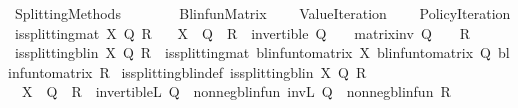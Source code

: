 %
\begin{isabellebody}%
%
%
\isadelimtheory
\isanewline
\isanewline
%
\endisadelimtheory
%
\isatagtheory
{}\isamarkupfalse%
\ Splitting{\isacharunderscore}{\kern0pt}Methods\isanewline
\ \ \ \isanewline
\ \ \ \ Blinfun{\isacharunderscore}{\kern0pt}Matrix\isanewline
\ \ \ \ Value{\isacharunderscore}{\kern0pt}Iteration\isanewline
\ \ \ \ Policy{\isacharunderscore}{\kern0pt}Iteration\isanewline
{}%
\endisatagtheory
{\isafoldtheory}%
%
\isadelimtheory
%
\endisadelimtheory
%
\isadelimdocument
%
\endisadelimdocument
%
\isatagdocument
%
\isamarkuptrue%
%
\isamarkuptrue%
%
\endisatagdocument
{\isafolddocument}%
%
\isadelimdocument
%
\endisadelimdocument
{}\isamarkupfalse%
\ {\isachardoublequoteopen}is{\isacharunderscore}{\kern0pt}splitting{\isacharunderscore}{\kern0pt}mat\ X\ Q\ R\ {\isasymlongleftrightarrow}\isanewline
\ \ X\ {\isacharequal}{\kern0pt}\ Q\ {\isacharminus}{\kern0pt}\ R\ {\isasymand}\ invertible\ Q\ {\isasymand}\ {}\ {\isasymle}\ matrix{\isacharunderscore}{\kern0pt}inv\ Q\ {\isasymand}\ {}\ {\isasymle}\ R{\isachardoublequoteclose}\isanewline
\isanewline
{}\isamarkupfalse%
\ {\isachardoublequoteopen}is{\isacharunderscore}{\kern0pt}splitting{\isacharunderscore}{\kern0pt}blin\ X\ Q\ R\ {\isasymlongleftrightarrow}\ is{\isacharunderscore}{\kern0pt}splitting{\isacharunderscore}{\kern0pt}mat\ {\isacharparenleft}{\kern0pt}blinfun{\isacharunderscore}{\kern0pt}to{\isacharunderscore}{\kern0pt}matrix\ X{\isacharparenright}{\kern0pt}\ {\isacharparenleft}{\kern0pt}blinfun{\isacharunderscore}{\kern0pt}to{\isacharunderscore}{\kern0pt}matrix\ Q{\isacharparenright}{\kern0pt}\ {\isacharparenleft}{\kern0pt}blinfun{\isacharunderscore}{\kern0pt}to{\isacharunderscore}{\kern0pt}matrix\ R{\isacharparenright}{\kern0pt}{\isachardoublequoteclose}\isanewline
\isanewline
{}\isamarkupfalse%
\ is{\isacharunderscore}{\kern0pt}splitting{\isacharunderscore}{\kern0pt}blin{\isacharunderscore}{\kern0pt}def{\isacharprime}{\kern0pt}{\isacharcolon}{\kern0pt}\ {\isachardoublequoteopen}is{\isacharunderscore}{\kern0pt}splitting{\isacharunderscore}{\kern0pt}blin\ X\ Q\ R\ {\isasymlongleftrightarrow}\isanewline
\ \ X\ {\isacharequal}{\kern0pt}\ Q\ {\isacharminus}{\kern0pt}\ R\ {\isasymand}\ invertible\isactrlsub L\ Q\ {\isasymand}\ nonneg{\isacharunderscore}{\kern0pt}blinfun\ {\isacharparenleft}{\kern0pt}inv\isactrlsub L\ Q{\isacharparenright}{\kern0pt}\ {\isasymand}\ nonneg{\isacharunderscore}{\kern0pt}blinfun\ R{\isachardoublequoteclose}\isanewline

\end{isabellebody}
